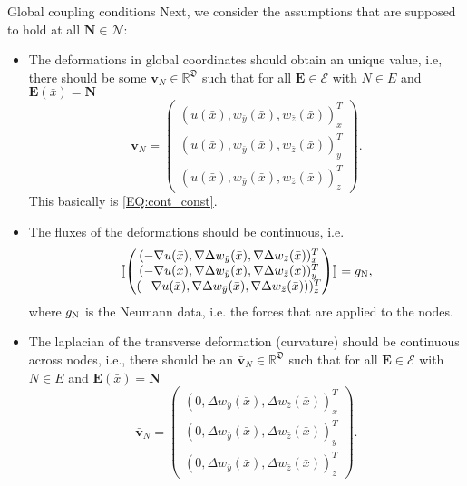 \documentclass[a4paper, english, 12pt, reqno, draft]{amsart}
\makeatletter
\theoremstyle{definition}
\theoremstyle{remark}
\numberwithin{equation}{section}
\newcommand{\edge}{\ensuremath{E}}
\newcommand{\node}{\ensuremath{N}}
\newcommand{\SetEdge}{\ensuremath{\boldsymbol{\mathcal E}}}
\newcommand{\SetNode}{\ensuremath{\boldsymbol{\mathcal N}}}
\newcommand{\Edge}{{\ensuremath{\boldsymbol E}}}
\newcommand{\Node}{{\ensuremath{\boldsymbol N}}}
\newcommand{\globDim}{\ensuremath{\mathfrak D}}
\newcommand{\jump}[1]{{[\![ #1 ]\!]}}
\newcommand{\IR}{\ensuremath{\mathbb R}}
\renewcommand{\vec}[1]{\ensuremath{\boldsymbol{#1}}}
\def\paragraph{\@startsection{paragraph}{4}%
  \z@\z@{-\fontdimen2\font}%
  {\normalfont\scshape}}
\makeatother
\begin{document}
\paragraph{Global coupling conditions}
% 
Next, we consider the assumptions that are supposed to hold at all $\Node \in \SetNode$:
% 
\begin{itemize}
 \item The deformations in global coordinates should obtain an unique value, i.e, there should be some $\vec v_\node \in \IR^\globDim$ such that for all $\Edge \in \SetEdge$ with $\node \in \edge$ and $\Edge(\bar x) = \Node$
 \begin{equation*}
  \vec v_\node = \begin{pmatrix} (u(\bar x), w_{\bar y}(\bar x), w_{\bar z}(\bar x))^T_x \\ (u(\bar x), w_{\bar y}(\bar x), w_{\bar z}(\bar x))^T_y \\ (u(\bar x), w_{\bar y}(\bar x), w_{\bar z}(\bar x))^T_z \end{pmatrix}.
 \end{equation*}
 This basically is \eqref{EQ:cont_const}.
 \item The fluxes of the deformations should be continuous, i.e.
 \begin{equation*}
  \jump{ \begin{pmatrix} (-\nabla u(\bar x), \nabla \Delta w_{\bar y}(\bar x), \nabla \Delta w_{\bar z}(\bar x))^T_x \\ (-\nabla u(\bar x), \nabla \Delta w_{\bar y}(\bar x), \nabla \Delta w_{\bar z}(\bar x))^T_y \\ (-\nabla u(\bar x), \nabla \Delta w_{\bar y}(\bar x), \nabla \Delta w_{\bar z}(\bar x)))^T_z \end{pmatrix} } = g_\text N,
 \end{equation*}
 where $g_\text N$ is the Neumann data, i.e. the forces that are applied to the nodes.
 \item The laplacian of the transverse deformation (curvature) should be continuous across nodes, i.e., there should be an $\bar{\vec v}_\node \in \IR^\globDim$ such that for all $\Edge \in \SetEdge$ with $\node \in \edge$ and $\Edge(\bar x) = \Node$
 \begin{equation*}
  \bar{\vec v}_\node = \begin{pmatrix} (0, \Delta w_{\bar y}(\bar x), \Delta w_{\bar z}(\bar x))^T_x \\ (0, \Delta w_{\bar y}(\bar x), \Delta w_{\bar z}(\bar x))^T_y \\ (0, \Delta w_{\bar y}(\bar x), \Delta w_{\bar z}(\bar x))^T_z \end{pmatrix}.

\end{equation*}
\end{itemize}
\end{document}
